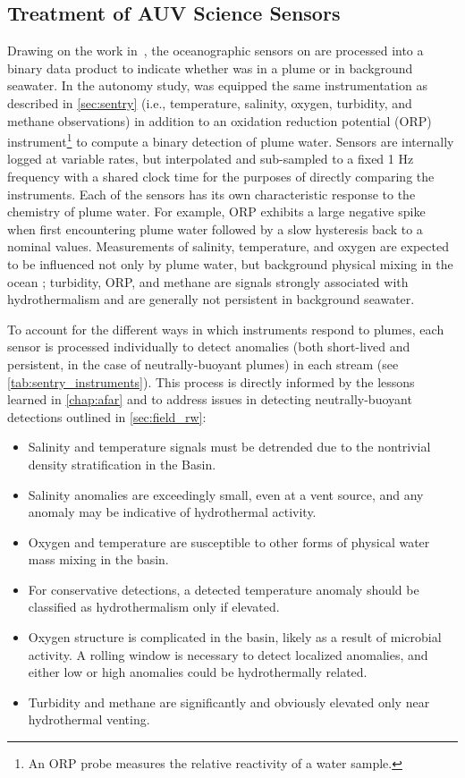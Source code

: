 \subsection{Treatment of AUV \Sentry Science Sensors}
\label{sec:field_sensor_models}
Drawing on the work in~\cite{jakuba2007stochastic}, the oceanographic sensors on \Sentry are processed into a binary data product to indicate whether \Sentry was in a plume or in background seawater. In the autonomy study, \Sentry was equipped the same instrumentation as described in \cref{sec:sentry} (i.e., temperature, salinity, oxygen, turbidity, and methane observations) in addition to an oxidation reduction potential (ORP) instrument\footnote{An ORP probe measures the relative reactivity of a water sample.} to compute a binary detection of plume water. Sensors are internally logged at variable rates, but interpolated and sub-sampled to a fixed 1 Hz frequency with a shared clock time for the purposes of directly comparing the instruments. Each of the sensors has its own characteristic response to the chemistry of plume water. For example, ORP exhibits a large negative spike when first encountering plume water followed by a slow hysteresis back to a nominal values. Measurements of salinity, temperature, and oxygen are expected to be influenced not only by plume water, but background physical mixing in the ocean \autocite{li2020increasing,speer1989model,preston2022physically}; turbidity, ORP, and methane are signals strongly associated with hydrothermalism and are generally not persistent in background seawater.

To account for the different ways in which instruments respond to plumes, each sensor is processed individually to detect anomalies (both short-lived and persistent, in the case of neutrally-buoyant plumes) in each stream (see \cref{tab:sentry_instruments}). This process is directly informed by the lessons learned in \cref{chap:afar} and to address issues in detecting neutrally-buoyant detections outlined in \cref{sec:field_rw}:
\begin{itemize}
    \item Salinity and temperature signals must be detrended due to the nontrivial density stratification in the Basin.
    \item Salinity anomalies are exceedingly small, even at a vent source, and any anomaly may be indicative of hydrothermal activity.
    \item Oxygen and temperature are susceptible to other forms of physical water mass mixing in the basin.
    \item For conservative detections, a detected temperature anomaly should be classified as hydrothermalism only if elevated.
    \item Oxygen structure is complicated in the basin, likely as a result of microbial activity. A rolling window is necessary to detect localized anomalies, and either low or high anomalies could be hydrothermally related.
    \item Turbidity and methane are significantly and obviously elevated only near hydrothermal venting.    
\end{itemize}

